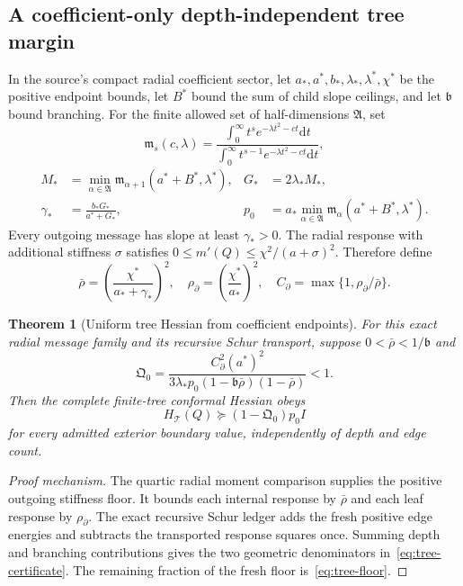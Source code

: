\documentclass[11pt,a4paper,oneside]{book}
\theoremstyle{plain}
\newtheorem{theorem}{Theorem}[chapter]
\theoremstyle{definition}
\theoremstyle{remark}
\newcommand{\dd}{\mathrm d}
\newcommand{\src}[2]{\cite{#1}}
\begin{document}
\subsection{A coefficient-only depth-independent tree margin}
In the source's compact radial coefficient sector, let $a_*,a^*,b_*,\lambda_*,\lambda^*,\chi^*$ be the positive endpoint bounds, let $B^*$ bound the sum of child slope ceilings, and let $\mathfrak b$ bound branching. For the finite allowed set of half-dimensions $\mathfrak A$, set
\begin{equation}
 \mathfrak m_s(c,\lambda)=
 \frac{\int_0^\infty t^s e^{-\lambda t^2-ct}\dd t}
      {\int_0^\infty t^{s-1}e^{-\lambda t^2-ct}\dd t},
\end{equation}
\begin{equation}
 \begin{aligned}
 M_*&=\min_{\alpha\in\mathfrak A}
       \mathfrak m_{\alpha+1}(a^*+B^*,\lambda^*),
 &G_*&=2\lambda_*M_*,\\
 \gamma_*&=\frac{b_*G_*}{a^*+G_*},
 &p_0&=a_*\min_{\alpha\in\mathfrak A}
       \mathfrak m_\alpha(a^*+B^*,\lambda^*).
 \end{aligned}
\end{equation}
Every outgoing message has slope at least $\gamma_*>0$. The radial response with additional stiffness $\sigma$ satisfies $0\le m'(Q)\le\chi^2/(a+\sigma)^2$. Therefore define
\begin{equation}
 \bar\rho=\left(\frac{\chi^*}{a_*+\gamma_*}\right)^2,
 \quad\rho_\partial=\left(\frac{\chi^*}{a_*}\right)^2,
 \quad C_\partial=\max\{1,\rho_\partial/\bar\rho\}.
\end{equation}
\src{R18}{thm:v18v24-stiffness,thm:v18v25-stiffness}

\begin{theorem}[Uniform tree Hessian from coefficient endpoints]
\label{thm:tree-margin}
For this exact radial message family and its recursive Schur transport, suppose $0<\bar\rho<1/\mathfrak b$ and
\begin{equation}
 \mathfrak Q_0=
 \frac{C_\partial^2(a^*)^2}
 {3\lambda_*p_0(1-\mathfrak b\bar\rho)(1-\bar\rho)}<1.
 \label{eq:tree-certificate}
\end{equation}
Then the complete finite-tree conformal Hessian obeys
\begin{equation}
 H_{\mathcal T}(Q)\succeq(1-\mathfrak Q_0)p_0I
 \label{eq:tree-floor}
\end{equation}
for every admitted exterior boundary value, independently of depth and edge count.
\end{theorem}
\begin{proof}[Proof mechanism]
The quartic radial moment comparison supplies the positive outgoing stiffness floor. It bounds each internal response by $\bar\rho$ and each leaf response by $\rho_\partial$. The exact recursive Schur ledger adds the fresh positive edge energies and subtracts the transported response squares once. Summing depth and branching contributions gives the two geometric denominators in~\eqref{eq:tree-certificate}. The remaining fraction of the fresh floor is~\eqref{eq:tree-floor}.
\end{proof}
\src{R18}{thm:v18v19-ledger,thm:v18v25-tree-gate}
\end{document}
